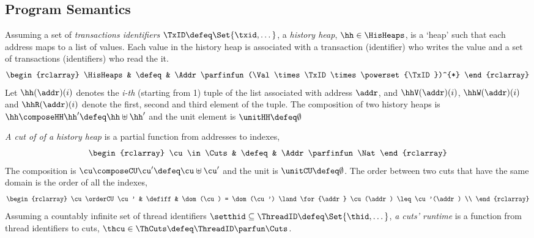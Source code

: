 \subsection{Program Semantics}
\begin{defn}
\label{def:his_heap}
Assuming a set of \emph{transactions identifiers} \( \TxID \defeq \Set{\txid, \dots}\), a \emph{history heap}, \( \hh \in \HisHeaps \), is a `heap' such that each address maps to a list of values.
Each value in the history heap is associated with a transaction (identifier) who writes the value and a set of transactions (identifiers) who read the it.
\[
\begin{rclarray}
    \HisHeaps & \defeq & \Addr \parfinfun (\Val \times \TxID \times \powerset{\TxID})^{*}
\end{rclarray}
\]
Let \( \hh(\addr)(i)\) denotes the \emph{i-th} (starting from 1) tuple of the list associated with address \( \addr \), and \( \hhV(\addr)(i) \), \( \hhW(\addr)(i) \) and \( \hhR(\addr)(i) \) denote the first, second and third element of the tuple.
The composition of two history heaps is \( \hh \composeHH \hh' \defeq \hh \uplus \hh' \) and the unit element is \( \unitHH \defeq \emptyset \)
\end{defn}

\begin{defn}
\label{def:cuts}
\emph{A cut of of a history heap} is a partial function from addresses to indexes,
\[
\begin{rclarray}
    \cu \in \Cuts & \defeq & \Addr \parfinfun \Nat
\end{rclarray}
\]                                                                     
The composition is \( \cu \composeCU \cu' \defeq \cu \uplus \cu'\) and the unit is \( \unitCU \defeq \emptyset\).
The order between two cuts that have the same domain is the order of all the indexes, 
\[
\begin{rclarray}
    \cu \orderCU \cu' & \defiff & \dom(\cu) = \dom(\cu') \land \for{\addr} \cu(\addr) \leq \cu'(\addr) \\
\end{rclarray}
\]
Assuming a countably infinite set of thread identifiers \( \setthid \subseteq \ThreadID \defeq \Set{\thid, \dots} \), \emph{a cuts' runtime} is a function from thread identifiers to cuts, \ie \( \thcu \in \ThCuts \defeq \ThreadID \parfun \Cuts\).
\end{defn}

